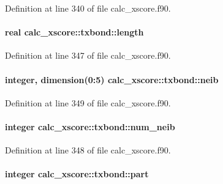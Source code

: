 Definition at line 340 of file calc\-\_\-xscore.\-f90.

\hypertarget{structcalc__xscore_1_1txbond_a678cee363bebc379d18806416b3f7d35}{
\paragraph[{length}]{\setlength{\rightskip}{0pt plus 5cm}real calc\-\_\-xscore\-::txbond\-::length}}\label{structcalc__xscore_1_1txbond_a678cee363bebc379d18806416b3f7d35}


Definition at line 347 of file calc\-\_\-xscore.\-f90.

\hypertarget{structcalc__xscore_1_1txbond_a97b686f796222bc93e255dc53cd10ff2}{
\paragraph[{neib}]{\setlength{\rightskip}{0pt plus 5cm}integer, dimension(0\-:5) calc\-\_\-xscore\-::txbond\-::neib}}\label{structcalc__xscore_1_1txbond_a97b686f796222bc93e255dc53cd10ff2}


Definition at line 349 of file calc\-\_\-xscore.\-f90.

\hypertarget{structcalc__xscore_1_1txbond_a7632802a73be1444be846a8aa93e4ce5}{
\paragraph[{num\-\_\-neib}]{\setlength{\rightskip}{0pt plus 5cm}integer calc\-\_\-xscore\-::txbond\-::num\-\_\-neib}}\label{structcalc__xscore_1_1txbond_a7632802a73be1444be846a8aa93e4ce5}


Definition at line 348 of file calc\-\_\-xscore.\-f90.

\hypertarget{structcalc__xscore_1_1txbond_ac373cd12c516bf47737dda668f588160}{
\paragraph[{part}]{\setlength{\rightskip}{0pt plus 5cm}integer calc\-\_\-xscore\-::txbond\-::part}}\label{structcalc__xscore_1_1txbond_ac373cd12c516bf47737dda668f588160}



